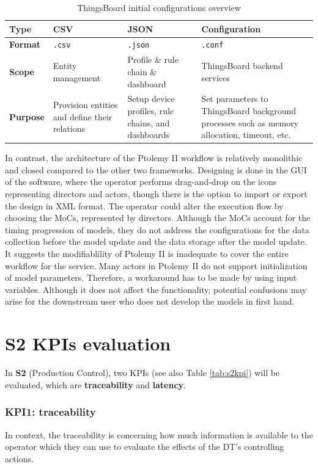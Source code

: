 \begin{table}[hbt!]
\centering
\begin{tabularx}{\textwidth}{|p{1.5cm}|p{3.5cm}|p{3.5cm}|X|}
\hline
\textbf{Type} & {CSV} & {JSON} & {Configuration} \\ \hline           
\textbf{Format} & \texttt{.csv} & \texttt{.json} & \texttt{.conf}  \\ \hline
\textbf{Scope} & Entity management & Profile \& rule chain \& dashboard & ThingsBoard backend services\\ \hline
\textbf{Purpose} & Provision entities and define their relations & Setup device profiles, rule chains, and dashboards & Set parameters to ThingsBoard background processes such as memory allocation, timeout, etc.\\ \hline    
\end{tabularx}
\caption{ThingsBoard initial configurations overview}
\label{tab:tbconfig}
\end{table}
 
In contrast, the architecture of the Ptolemy II workflow is relatively monolithic and closed compared to the other two frameworks. Designing is done in the GUI of the software, where the operator performs drag-and-drop on the icons representing directors and actors, though there is the option to import or export the design in XML format. The operator could alter the execution flow by choosing the MoCs, represented by directors. Although the MoCs account for the timing progression of models, they do not address the configurations for the data collection before the model update and the data storage after the model update. It suggests the modifiablility of Ptolemy II is inadequate to cover the entire workflow for the service. Many actors in Ptolemy II do not support initialization of model parameters. Therefore, a workaround has to be made by using input variables. Although it does not affect the functionality, potential confusions may arise for the downstream user who does not develop the models in first hand.

\section{S2 KPIs evaluation}
In \textbf{S2} (Production Control), two KPIs (see also Table \ref{tab:s2kpi}) will be evaluated, which are \textbf{traceability} and \textbf{latency}. 
\subsubsection{KPI1: traceability}
In context, the traceability is concerning how much information is available to the operator which they can use to evaluate the effects of the DT's controlling actions.

